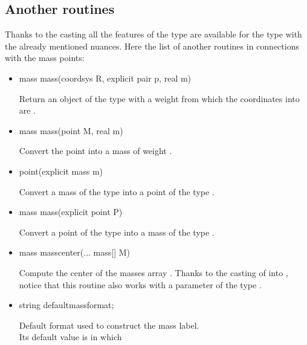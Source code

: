 \documentclass[pdftex]{article}
\begin{document}
\subsection{Another  routines}
Thanks to the casting all the features of the type 
are available for the type  with the already mentioned
nuances. Here the list of another routines in connections with the
mass points:
\begin{itemize}
\item {}
  \begin{Vcolor}
    mass mass(coordsys R, explicit pair p, real m)
  \end{Vcolor}
  Return an object of the type  with a weight 
  from which the coordinates into  are .
\item {}
  \begin{Vcolor}
    mass mass(point M, real m)
  \end{Vcolor}
  Convert the point  into a mass of weight .
\item {}
  \begin{Vcolor}
    point(explicit mass m)
  \end{Vcolor}
  Convert a mass of the type  into a point of the type .
\item {}
  \begin{Vcolor}
    mass mass(explicit point P)
  \end{Vcolor}
  Convert a point of the type  into a mass of the type .
\item {}
  \begin{Vcolor}
    mass masscenter(... mass[] M)
  \end{Vcolor}
  Compute the center of the masses array .
  Thanks to the casting of  into , notice
  that this routine also works with a parameter of the type .
\item {}
  \begin{Vcolor}
    string defaultmassformat;
  \end{Vcolor}
  Default format used to construct the mass label.\\
  Its default value is
    in which

\end{itemize}
\end{document}
